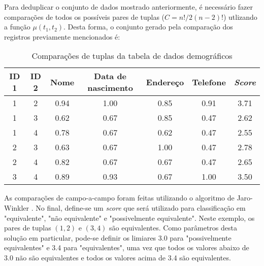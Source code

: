 \documentclass[
	12pt,				%
	openany,			%
	twoside,			%
	a4paper,			%
	brazil,				%
	]{unimontes-ppgmsc-abntex2}
\begin{document}
Para deduplicar o conjunto de dados mostrado anteriormente, é necessário fazer comparações de todos os possíveis pares de tuplas ($C = n!/2(n-2)!$) utlizando a função $\mu(t_1,t_2)$. Desta forma, o conjunto gerado pela comparação dos registros previamente mencionados é:

\begin{table}[!htpb]
    \centering
    \caption{Comparações de tuplas da tabela de dados demográficos}
    \label{comparacao}
    \begin{tabular}{|c|c|c|c|c|c|c|}
        \hline
        \textbf{ID 1} & \textbf{ID 2} & \textbf{Nome} & \textbf{Data de nascimento} & \textbf{Endereço} & \textbf{Telefone} & \textbf{\textit{Score}} \\ \hline
        1 & 2 & 0.94 & 1.00 & 0.85 & 0.91 & 3.71 \\ \hline
        1 & 3 & 0.62 & 0.67 & 0.85 & 0.47 & 2.62 \\ \hline
        1 & 4 & 0.78 & 0.67 & 0.62 & 0.47 & 2.55 \\ \hline
        2 & 3 & 0.63 & 0.67 & 1.00 & 0.47 & 2.78 \\ \hline
        2 & 4 & 0.82 & 0.67 & 0.67 & 0.47 & 2.65 \\ \hline
        3 & 4 & 0.89 & 0.93 & 0.67 & 1.00 & 3.50 \\ \hline
    \end{tabular}
\end{table}

As comparações de campo-a-campo foram feitas utilizando o algoritmo de Jaro-Winkler \cite{jaro}. No final, define-se um \textit{score} que será utilizado para classificação em "equivalente", "não equivalente" e "possivelmente equivalente". Neste exemplo, os pares de tuplas $(1,2)$ e $(3,4)$ são equivalentes. Como parâmetros desta solução em particular, pode-se definir os limiares 3.0 para "possivelmente equivalentes" e 3.4 para "equivalentes", uma vez que todos os valores abaixo de 3.0 não são equivalentes e todos os valores acima de 3.4 são equivalentes.

\end{document}
